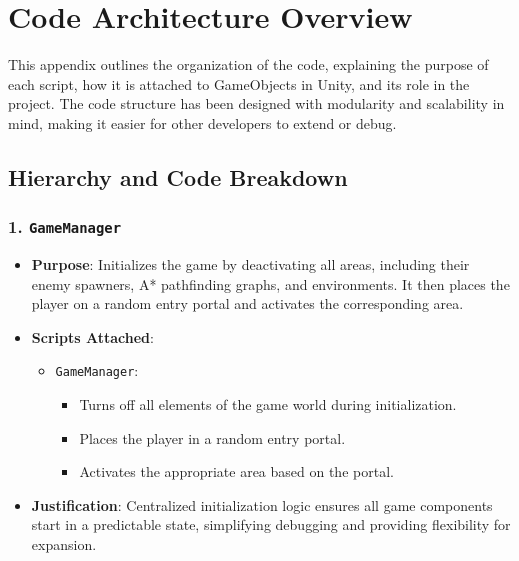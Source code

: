 \documentclass[10pt,twocolumn]{article}
\begin{document}
\appendix
\section{Code Architecture Overview}

This appendix outlines the organization of the code, explaining the purpose of each script, how it is attached to GameObjects in Unity, and its role in the project. The code structure has been designed with modularity and scalability in mind, making it easier for other developers to extend or debug.

\subsection{Hierarchy and Code Breakdown}

\subsubsection{1. \texttt{GameManager}}
\begin{itemize}
    \item \textbf{Purpose}: Initializes the game by deactivating all areas, including their enemy spawners, A* pathfinding graphs, and environments. It then places the player on a random entry portal and activates the corresponding area.
    \item \textbf{Scripts Attached}:
    \begin{itemize}
        \item \texttt{GameManager}:
        \begin{itemize}
            \item Turns off all elements of the game world during initialization.
            \item Places the player in a random entry portal.
            \item Activates the appropriate area based on the portal.
        \end{itemize}
    \end{itemize}
    \item \textbf{Justification}: Centralized initialization logic ensures all game components start in a predictable state, simplifying debugging and providing flexibility for expansion.
\end{itemize}
\end{document}
